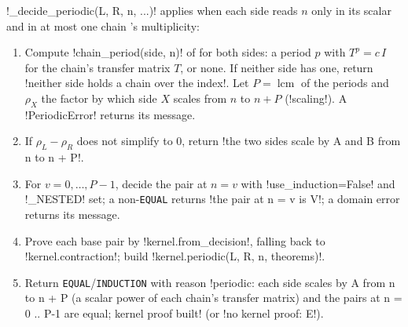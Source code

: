 \begin{algorithm}\label{alg:proofs-periodic}
\py!_decide_periodic(L, R, n, ...)! applies when each side reads $n$ only in its scalar and in at most one chain \bbox's multiplicity:
\begin{enumerate}
\item Compute \py!chain_period(side, n)! of  for both sides: a period $p$ with $T^p=c\,I$ for the chain's transfer matrix $T$, or none. If neither side has one, return \code!neither side holds a chain over the index!. Let $P=\operatorname{lcm}$ of the periods and $\rho_X$ the factor by which side $X$ scales from $n$ to $n+P$ (\py!scaling!). A \py!PeriodicError! returns its message.
\item If $\rho_L-\rho_R$ does not simplify to $0$, return \code!the two sides scale by A and B from n to n + P!.
\item For $v=0,\ldots,P-1$, decide the pair at $n=v$ with \py!use_induction=False! and \py!_NESTED! set; a non-\texttt{EQUAL} returns \code!the pair at n = v is V!; a domain error returns its message.
\item Prove each base pair by \py!kernel.from_decision!, falling back to \py!kernel.contraction!; build \py!kernel.periodic(L, R, n, theorems)!.
\item Return \texttt{EQUAL}/\allowbreak\texttt{INDUCTION} with reason \code!periodic: each side scales by A from n to n + P (a scalar power of each chain's transfer matrix) and the pairs at n = 0 .. P-1 are equal; kernel proof built! (or \code!no kernel proof: E!).
\end{enumerate}
\end{algorithm}


